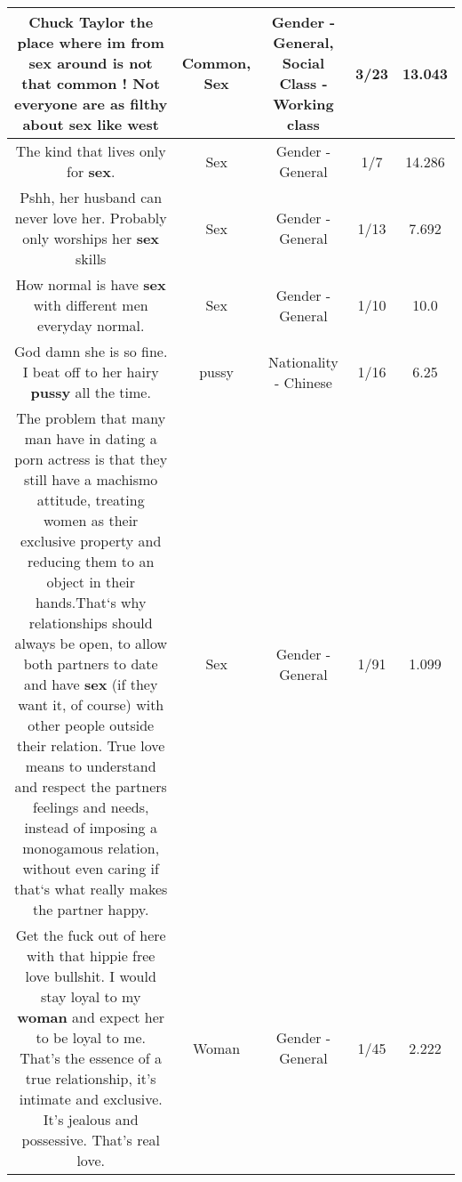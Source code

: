 \documentclass[11pt]{article}
\newlength\mylength
\begin{document}
\begin{center}
\begin{longtable}{|C{.65\mylength}|C{.30\mylength}|C{.12\mylength}|C{.12\mylength}|C{.12\mylength}|}
  \small Chuck Taylor the place where im from \textbf{sex} around is not that \textbf{common} ! Not everyone are as filthy about \textbf{sex} like west\normalsize   & Common, Sex & Gender - General, Social Class - Working class & 3/23 & 13.043 \\  \hline
  \small The kind that lives only for \textbf{sex}.\normalsize   & Sex & Gender - General & 1/7 & 14.286 \\  \hline
  \small Pshh, her husband can never love her. Probably only worships her \textbf{sex} skills\normalsize   & Sex & Gender - General & 1/13 & 7.692 \\  \hline
  \small How normal is have \textbf{sex} with different men everyday normal.\normalsize   & Sex & Gender - General & 1/10 & 10.0 \\  \hline
  \small God damn she is so fine. I beat off to her hairy \textbf{pussy} all the time.\normalsize   & pussy & Nationality - Chinese & 1/16 & 6.25 \\  \hline
  \small The problem that many man have in dating a porn actress is that they still have a machismo attitude, treating women as their exclusive property and reducing them to an object in their hands.That`s why relationships should always be open, to allow both partners to date and have \textbf{sex} (if they want it, of course) with other people outside their relation. True love means to understand and respect the partners feelings and needs, instead of imposing a monogamous relation, without even caring if that`s what really makes the partner happy.\normalsize   & Sex & Gender - General & 1/91 & 1.099 \\  \hline
  \small Get the fuck out of here with that hippie free love bullshit. I would stay loyal to my \textbf{woman} and expect her to be loyal to me. That's the essence of a true relationship, it's intimate and exclusive. It's jealous and possessive. That's real love.\normalsize   & Woman & Gender - General & 1/45 & 2.222 \\  \hline

\end{longtable}
\end{center}
\end{document}
